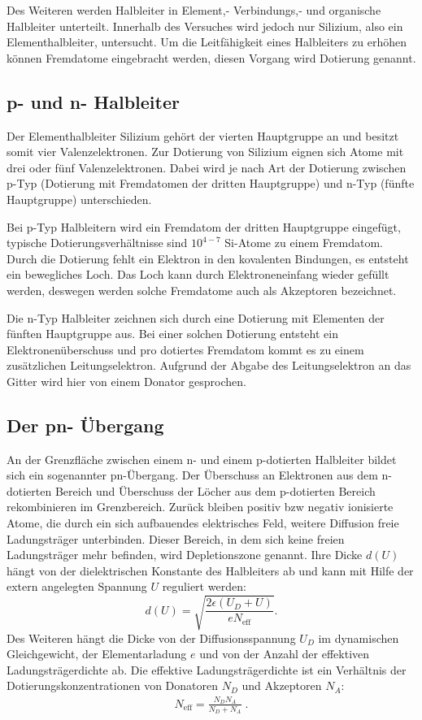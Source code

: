  Des Weiteren werden Halbleiter in Element,-
Verbindungs,- und organische Halbleiter unterteilt. Innerhalb des Versuches wird
jedoch nur Silizium, also ein Elementhalbleiter, untersucht. Um die Leitfähigkeit
eines Halbleiters zu erhöhen können Fremdatome eingebracht werden, diesen Vorgang wird Dotierung genannt.


\subsection{p- und n- Halbleiter}
Der Elementhalbleiter Silizium gehört der vierten Hauptgruppe an und besitzt somit
vier Valenzelektronen. Zur Dotierung von Silizium eignen sich Atome mit drei oder
fünf Valenzelektronen. Dabei wird je nach Art der Dotierung zwischen
p-Typ (Dotierung mit Fremdatomen der dritten Hauptgruppe) und n-Typ (fünfte Hauptgruppe)
unterschieden.

Bei p-Typ Halbleitern wird ein Fremdatom der dritten Hauptgruppe eingefügt,
typische Dotierungsverhältnisse sind $10^{4-7}$ Si-Atome zu einem Fremdatom.
Durch die Dotierung fehlt ein Elektron in den kovalenten Bindungen, es entsteht ein
bewegliches Loch. Das Loch kann durch Elektroneneinfang wieder gefüllt werden,
deswegen werden solche Fremdatome auch als Akzeptoren bezeichnet.

Die n-Typ Halbleiter zeichnen sich durch eine Dotierung mit Elementen der
fünften Hauptgruppe aus. Bei einer solchen Dotierung entsteht ein Elektronenüberschuss
und pro dotiertes Fremdatom kommt es zu einem zusätzlichen Leitungselektron. Aufgrund
der Abgabe des Leitungselektron an das Gitter wird hier von einem Donator gesprochen.

\subsection{Der pn- Übergang}
An der Grenzfläche zwischen einem n- und einem p-dotierten Halbleiter bildet sich ein sogenannter pn-Übergang.
Der Überschuss an Elektronen aus dem n-dotierten Bereich und Überschuss der Löcher aus dem p-dotierten Bereich rekombinieren im Grenzbereich.
Zurück bleiben positiv bzw negativ ionisierte Atome, die durch ein sich aufbauendes elektrisches Feld, weitere Diffusion freie Ladungsträger unterbinden.
Dieser Bereich, in dem sich keine freien Ladungsträger mehr befinden, wird Depletionszone genannt. Ihre Dicke $d(U)$ hängt von der
dielektrischen Konstante des Halbleiters ab und kann mit
Hilfe der extern angelegten Spannung $U$ reguliert werden:
\begin{equation}
    \label{depl}
    d(U)=\sqrt{ \frac{ 2 \epsilon (U_D +U ) }{e N_\text{eff}}}.
\end{equation}
Des Weiteren hängt die Dicke von der Diffusionsspannung $U_D$ im dynamischen Gleichgewicht,
der Elementarladung $e$ und von der Anzahl der effektiven Ladungsträgerdichte ab. Die
effektive Ladungsträgerdichte ist ein Verhältnis der Dotierungskonzentrationen von
Donatoren $N_D$ und Akzeptoren $N_A$:
\begin{align}
	N_\text{eff}=\frac{N_D N_A}{N_D +N_A}\;.
\end{align}

